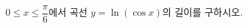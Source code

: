 \hspace*{2mm}\begin{minipage}[t]{\dimexpr\linewidth-2mm\relax}\vspace{0pt}
$0\le x\le\dfrac{\pi}{6}$에서 곡선 $y=\ln(\cos x)$의 길이를 구하시오.\end{minipage}
